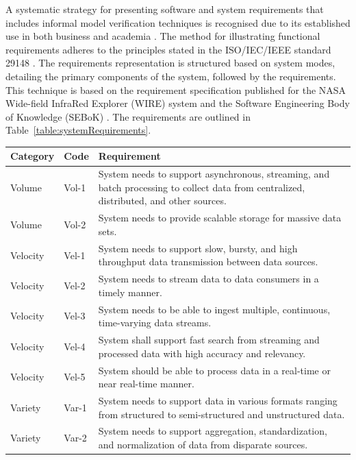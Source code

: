 \documentclass[preprint,12pt]{elsarticle}
\begin{document}
A systematic strategy for presenting software and system requirements that includes informal model verification techniques is recognised due to its established use in both business and academia \cite{kassab2014state}. The method for illustrating functional requirements adheres to the principles stated in the ISO/IEC/IEEE standard 29148 \cite{ISO29148}. The requirements representation is structured based on system modes, detailing the primary components of the system, followed by the requirements. This technique is based on the requirement specification published for the NASA Wide-field InfraRed Explorer (WIRE) system \cite{NASA} and the Software Engineering Body of Knowledge (SEBoK) \cite{abran2004software}. The requirements are outlined in Table~\ref{table:systemRequirements}.

\renewcommand{\arraystretch}{1.5}
\begin{longtable}{|p{2cm}|p{1cm}|p{9cm}|}
    \hline
    \textbf{Category} & \textbf{Code} & \textbf{Requirement} \\
    \hline
    \endhead
    Volume & Vol-1 & System needs to support asynchronous, streaming, and batch processing to collect data from centralized, distributed, and other sources. \\
    \hline
    Volume & Vol-2 & System needs to provide scalable storage for massive data sets. \\
    \hline
    Velocity & Vel-1 & System needs to support slow, bursty, and high throughput data transmission between data sources. \\
    \hline
    Velocity & Vel-2 & System needs to stream data to data consumers in a timely manner. \\
    \hline
    Velocity & Vel-3 & System needs to be able to ingest multiple, continuous, time-varying data streams. \\
    \hline
    Velocity & Vel-4 & System shall support fast search from streaming and processed data with high accuracy and relevancy. \\
    \hline
    Velocity & Vel-5 & System should be able to process data in a real-time or near real-time manner. \\
    \hline
    Variety & Var-1 & System needs to support data in various formats ranging from structured to semi-structured and unstructured data. \\
    \hline
    Variety & Var-2 & System needs to support aggregation, standardization, and normalization of data from disparate sources. \\

\end{longtable}
\end{document}
